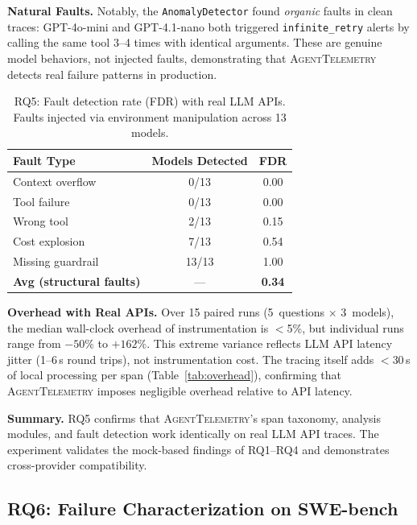 \documentclass[sigplan,10pt,screen]{acmart}
\begin{document}
\textbf{Natural Faults.}
Notably, the \texttt{AnomalyDetector} found \emph{organic} faults in
clean traces: GPT-4o-mini and GPT-4.1-nano both triggered
\texttt{infinite\_retry} alerts by calling the same tool 3--4 times with
identical arguments.  These are genuine model behaviors, not injected faults,
demonstrating that \textsc{AgentTelemetry} detects real failure patterns
in production.

\begin{table}[t]
\centering
\small
\caption{RQ5: Fault detection rate (FDR) with real LLM APIs.
Faults injected via environment manipulation across 13 models.}
\label{tab:rq5-fdr}
\begin{tabular}{@{}lcc@{}}
\toprule
\textbf{Fault Type} & \textbf{Models Detected} & \textbf{FDR} \\
\midrule
Context overflow    & 0/13  & 0.00 \\
Tool failure        & 0/13  & 0.00 \\
Wrong tool          & 2/13  & 0.15 \\
Cost explosion      & 7/13  & 0.54 \\
Missing guardrail   & 13/13 & 1.00 \\
\midrule
\textbf{Avg (structural faults)} & --- & \textbf{0.34} \\
\bottomrule
\end{tabular}
\end{table}

\textbf{Overhead with Real APIs.}
Over 15 paired runs (5~questions $\times$ 3~models), the median
wall-clock overhead of instrumentation is $<$5\%, but individual runs
range from $-50\%$ to $+162\%$.  This extreme variance reflects
LLM API latency jitter (1--6\,s round trips), not instrumentation cost.
The tracing itself adds $<$30\,\textmu s of local processing per span
(Table~\ref{tab:overhead}),
confirming that \textsc{AgentTelemetry} imposes negligible overhead
relative to API latency.

\textbf{Summary.}
RQ5 confirms that \textsc{AgentTelemetry}'s span taxonomy, analysis
modules, and fault detection work identically on real LLM API traces.
The experiment validates the mock-based findings of RQ1--RQ4 and
demonstrates cross-provider compatibility.

\subsection{RQ6: Failure Characterization on SWE-bench}
\label{sec:rq6}
\end{document}
